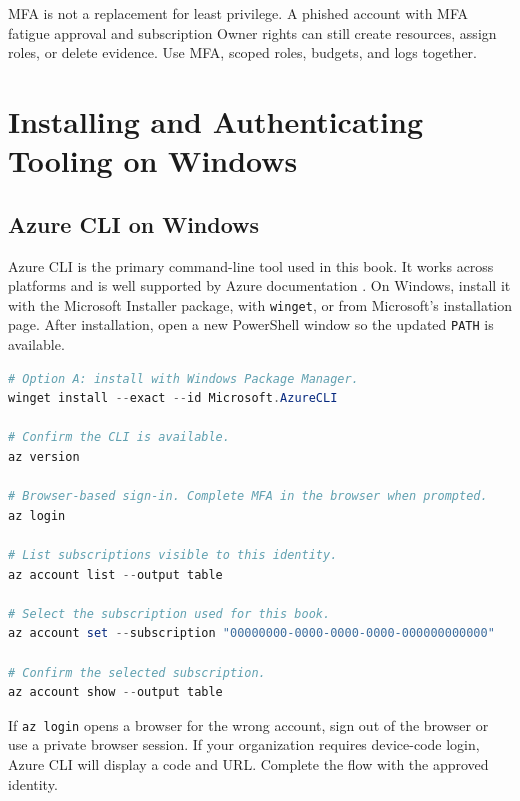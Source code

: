 \begin{notebox}
MFA is not a replacement for least privilege. A phished account with MFA fatigue approval and subscription Owner rights can still create resources, assign roles, or delete evidence. Use MFA, scoped roles, budgets, and logs together.
\end{notebox}

\section{Installing and Authenticating Tooling on Windows}

\subsection{Azure CLI on Windows}
Azure CLI is the primary command-line tool used in this book. It works across platforms and is well supported by Azure documentation \cite{microsoft2025azureCliInstall}. On Windows, install it with the Microsoft Installer package, with \texttt{winget}, or from Microsoft's installation page. After installation, open a new PowerShell window so the updated \texttt{PATH} is available.

\begin{lstlisting}[language=PowerShell,caption={Installing Azure CLI and signing in from Windows PowerShell.},label={lst:install-az-cli}]
# Option A: install with Windows Package Manager.
winget install --exact --id Microsoft.AzureCLI

# Confirm the CLI is available.
az version

# Browser-based sign-in. Complete MFA in the browser when prompted.
az login

# List subscriptions visible to this identity.
az account list --output table

# Select the subscription used for this book.
az account set --subscription "00000000-0000-0000-0000-000000000000"

# Confirm the selected subscription.
az account show --output table
\end{lstlisting}

If \texttt{az login} opens a browser for the wrong account, sign out of the browser or use a private browser session. If your organization requires device-code login, Azure CLI will display a code and URL. Complete the flow with the approved identity.

